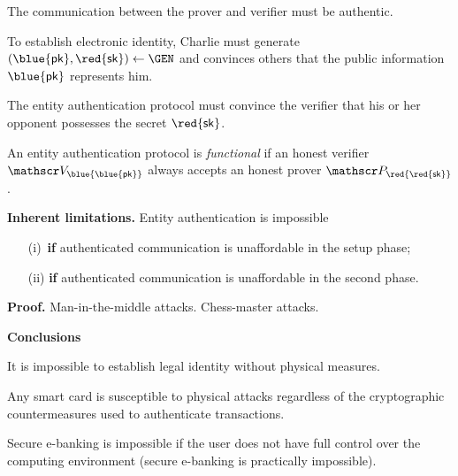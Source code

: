 \documentclass[landscape,footrule]{foils}
\newcommand{\spreadappart}{\vspace*{\fill}}
\renewcommand{\SK}{{\red{\mathsf{sk}}}}
\renewcommand{\PK}{{\blue{\mathsf{pk}}}}
\begin{document}
\titlefoil




\begin{triangles}
\item The communication between the prover and verifier must be
  authentic.
\item To establish electronic identity, Charlie must generate
  $(\PK,\SK)\gets\GEN$ and convinces others that the public
  information $\PK$ represents him.
\item The entity authentication protocol must convince the verifier
  that his or her opponent possesses the secret $\SK$.
\item An entity authentication protocol is \emph{functional} if an
  honest verifier $\VERIFIER_{\blue{\PK}}$ always accepts an honest prover
  $\PROVER_{\red{\SK}}$.
\end{triangles}


\textbf{Inherent limitations.}  Entity authentication is impossible 
\begin{itemize}
 \item[(i)\,] \textbf{if} authenticated communication is unaffordable in the setup
  phase;
\item[(ii)] \textbf{if} authenticated communication is unaffordable in the second phase.
\end{itemize}
\bigskip


\textbf{Proof.} Man-in-the-middle attacks. Chess-master attacks.
\Bigskip  
\spreadappart

\textbf{Conclusions}
\begin{triangles}
  \item It is impossible to establish legal identity without physical measures.
  \item Any smart card is susceptible to physical attacks regardless of
    the cryptographic countermeasures used to authenticate transactions.
  \item Secure e-banking is impossible if the user does not have full
    control over the computing environment (secure e-banking is
    practically impossible).
\end{triangles}


\end{document}

